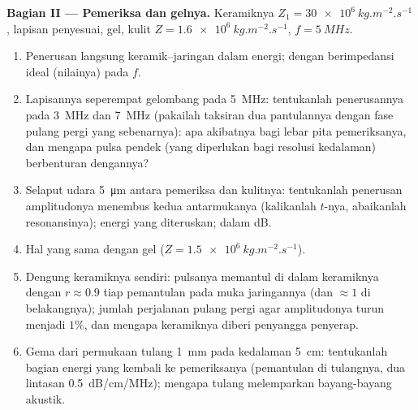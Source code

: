 \begin{problem}
\medskip
\noindent\textbf{Bagian II --- Pemeriksa dan gelnya.}
Keramiknya $Z_1 = \qty{30e6}{kg.m^{-2}.s^{-1}}$, lapisan penyesuai, gel, kulit $Z =
\qty{1.6e6}{kg.m^{-2}.s^{-1}}$, $f = \qty{5}{MHz}$.
\begin{enumerate}[resume]
  \item Penerusan langsung keramik--jaringan dalam energi; dengan
         berimpedansi ideal (nilainya) pada $f$.
  \item Lapisannya seperempat gelombang pada \qty{5}{MHz}: tentukanlah penerusannya
        pada \qty{3}{MHz} dan \qty{7}{MHz} (pakailah taksiran dua pantulannya
        dengan fase pulang pergi yang sebenarnya): apa akibatnya bagi
        lebar pita pemeriksanya, dan mengapa pulsa pendek (yang diperlukan bagi resolusi
        kedalaman) berbenturan dengannya?
  \item Selaput udara \qty{5}{\micro m} antara pemeriksa dan kulitnya: tentukanlah penerusan
        amplitudonya menembus kedua antarmukanya (kalikanlah $t$-nya,
        abaikanlah resonansinya); energi yang diteruskan; dalam dB.
  \item Hal yang sama dengan gel ($Z = \qty{1.5e6}{kg.m^{-2}.s^{-1}}$).
  \item Dengung keramiknya sendiri: pulsanya memantul di dalam
        keramiknya dengan $r \approx 0.9$ tiap pemantulan pada muka jaringannya
        (dan $\approx 1$ di belakangnya); jumlah perjalanan pulang pergi agar
        amplitudonya turun menjadi $1\%$, dan mengapa keramiknya diberi
        penyangga penyerap.
  \item Gema dari permukaan tulang \qty{1}{mm} pada kedalaman \qty{5}{cm}: tentukanlah bagian
        energi yang kembali ke pemeriksanya (pemantulan di tulangnya, dua
        lintasan  \qty{0.5}{dB/cm/MHz}); mengapa tulang melemparkan
        bayang-bayang akustik.
\end{enumerate}


\end{problem}
